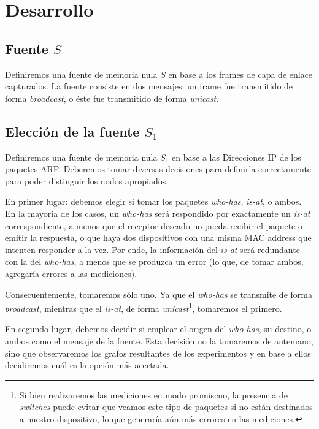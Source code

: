 \section{Desarrollo}

\subsection{Fuente $S$}

\par Definiremos una fuente de memoria nula $S$ en base a los frames de capa de enlace capturados. 
La fuente consiste en dos mensajes: un frame fue transmitido de forma \textit{broadcast}, o éste fue transmitido de forma \textit{unicast}.

\subsection{Elección de la fuente $S_1$}

\par Definiremos una fuente de memoria nula $S_1$ en base a las Direcciones IP de los paquetes ARP. 
Deberemos tomar diversas decisiones para definirla correctamente para poder distinguir los nodos apropiados.

\par En primer lugar: debemos elegir si tomar los paquetes \textit{who-has}, \textit{is-at}, o ambos.
En la mayoría de los casos, un \textit{who-has} será respondido por exactamente un \textit{is-at} correspondiente, a menos que el receptor deseado no pueda recibir el paquete o emitir la respuesta, o que haya dos dispositivos con una misma MAC address que intenten responder a la vez.
Por ende, la información del \textit{is-at} será redundante con la del \textit{who-has}, a menos que se produzca un error (lo que, de tomar ambos, agregaría errores a las mediciones).

\par Consecuentemente, tomaremos sólo uno.
Ya que el \textit{who-has} se transmite de forma \textit{broadcast}, mientras que el \textit{is-at}, de forma \textit{unicast}\footnote{Si bien realizaremos las mediciones en modo promiscuo, la presencia de \textit{switches} puede evitar que veamos este tipo de paquetes si no están destinados a nuestro dispositivo, lo que generaría aún más errores en las mediciones.}, tomaremos el primero.

\par En segundo lugar, debemos decidir si emplear el origen del \textit{who-has}, su destino, o ambos como el mensaje de la fuente.
Esta decisión no la tomaremos de antemano, sino que observaremos los grafos resultantes de los experimentos y en base a ellos decidiremos cuál es la opción más acertada.

